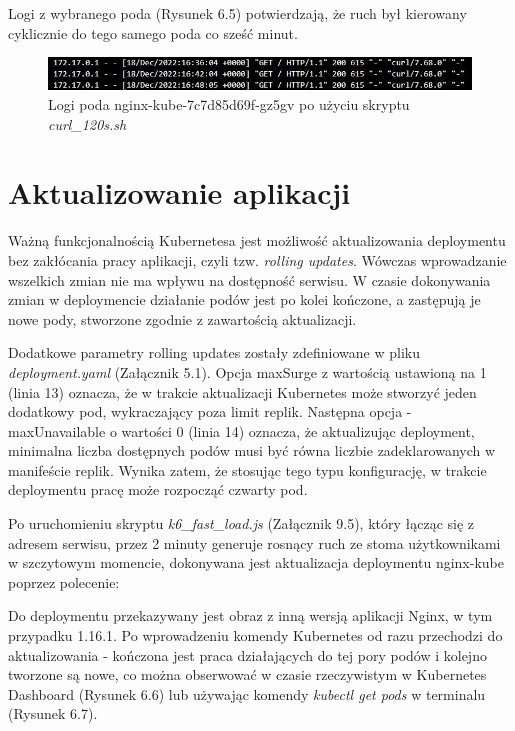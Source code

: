 Logi z wybranego poda (Rysunek 6.5) potwierdzają, że ruch był kierowany cyklicznie do tego samego poda co sześć minut. 

\begin{figure}[h]
    \centering
    \includegraphics[width=1\textwidth]{img/load2.jpg}
    \caption{Logi poda nginx-kube-7c7d85d69f-gz5gv po użyciu skryptu \textit{curl\_120s.sh}}
\end{figure}

\section{Aktualizowanie aplikacji}

Ważną funkcjonalnością Kubernetesa jest możliwość aktualizowania deploymentu bez zakłócania pracy aplikacji, czyli tzw. \textit{rolling updates}. Wówczas wprowadzanie wszelkich zmian nie ma wpływu na dostępność serwisu. W czasie dokonywania zmian w deploymencie działanie podów jest po kolei kończone, a zastępują je nowe pody, stworzone zgodnie z zawartością aktualizacji. 

Dodatkowe parametry rolling updates zostały zdefiniowane w pliku \textit{deployment.yaml} (Załącznik 5.1). Opcja maxSurge z wartością ustawioną na 1 (linia 13) oznacza, że w trakcie aktualizacji Kubernetes może stworzyć jeden dodatkowy pod, wykraczający poza limit replik. Następna opcja - maxUnavailable o wartości 0 (linia 14) oznacza, że aktualizując deployment, minimalna liczba dostępnych podów musi być równa liczbie zadeklarowanych w manifeście replik. Wynika zatem, że stosując tego typu konfigurację, w trakcie deploymentu pracę może rozpocząć czwarty pod.

\newpage
Po uruchomieniu skryptu \textit{k6\_fast\_load.js} (Załącznik 9.5), który łącząc się z adresem serwisu, przez 2 minuty generuje rosnący ruch ze stoma użytkownikami w szczytowym momencie, dokonywana jest aktualizacja deploymentu nginx-kube poprzez polecenie:



Do deploymentu przekazywany jest obraz z inną wersją aplikacji Nginx, w tym przypadku 1.16.1. Po wprowadzeniu komendy Kubernetes od razu przechodzi do aktualizowania - kończona jest praca działających do tej pory podów i kolejno tworzone są nowe, co można obserwować w czasie rzeczywistym w Kubernetes Dashboard (Rysunek 6.6) lub używając komendy \textit{kubectl get pods} w  terminalu (Rysunek 6.7). 

